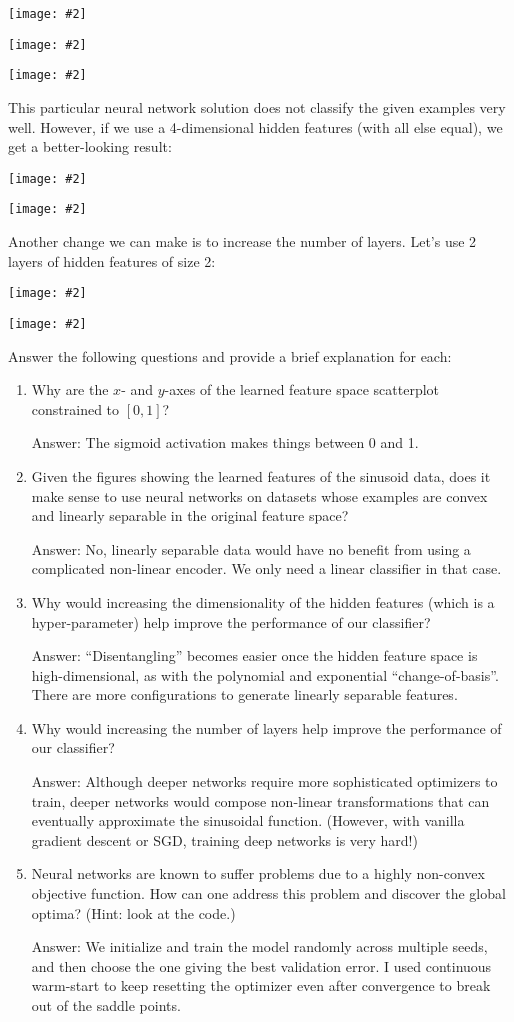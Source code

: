 \documentclass{article}
\def\ans#1{\par\gre{Answer: #1}}
\def\blu#1{{\color{blu}#1}}
\def\gre#1{{\color{gre}#1}}
\newcommand{\centerfig}[2]{\begin{center}\texttt{[image: \#2]}\end{center}}
\def\enum#1{\begin{enumerate}#1\end{enumerate}}
\begin{document}
\centerfig{.7}{../figs/sinusoids.png}
\centerfig{.7}{../figs/sinusoids_learned_features_[2]_2.png}
\centerfig{.7}{../figs/sinusoids_decision_boundary_[2]_2.png}

This particular neural network solution does not classify the given examples very well. However, if we use a 4-dimensional hidden features (with all else equal), we get a better-looking result:

\centerfig{.7}{../figs/sinusoids_learned_features_[4]_2.png}
\centerfig{.7}{../figs/sinusoids_decision_boundary_[4]_2.png}

Another change we can make is to increase the number of layers. Let's use 2 layers of hidden features of size 2:

\centerfig{.7}{../figs/sinusoids_learned_features_[2, 2]_2.png}
\centerfig{.7}{../figs/sinusoids_decision_boundary_[2, 2]_2.png}

Answer the following questions and provide a brief explanation for each:

\blu{
\enum{
\item Why are the $x$- and $y$-axes of the learned feature space scatterplot constrained to $[0, 1]$?
\ans{The sigmoid activation makes things between 0 and 1.}
\item Given the figures showing the learned features of the sinusoid data, does it make sense to use neural networks on datasets whose examples are convex and linearly separable in the original feature space?
\ans{No, linearly separable data would have no benefit from using a complicated non-linear encoder. We only need a linear classifier in that case.}
\item Why would increasing the dimensionality of the hidden features (which is a hyper-parameter) help improve the performance of our classifier?
\ans{``Disentangling'' becomes easier once the hidden feature space is high-dimensional, as with the polynomial and exponential ``change-of-basis''. There are more configurations to generate linearly separable features.
}
\item Why would increasing the number of layers help improve the performance of our classifier?
\ans{Although deeper networks require more sophisticated optimizers to train, deeper networks would compose non-linear transformations that can eventually approximate the sinusoidal function. (However, with vanilla gradient descent or SGD, training deep networks is very hard!)}
\item Neural networks are known to suffer problems due to a highly non-convex objective function. How can one address this problem and discover the global optima? (Hint: look at the code.)
\ans{We initialize and train the model randomly across multiple seeds, and then choose the one giving the best validation error. I used continuous warm-start to keep resetting the optimizer even after convergence to break out of the saddle points.}
}
}
\end{document}

